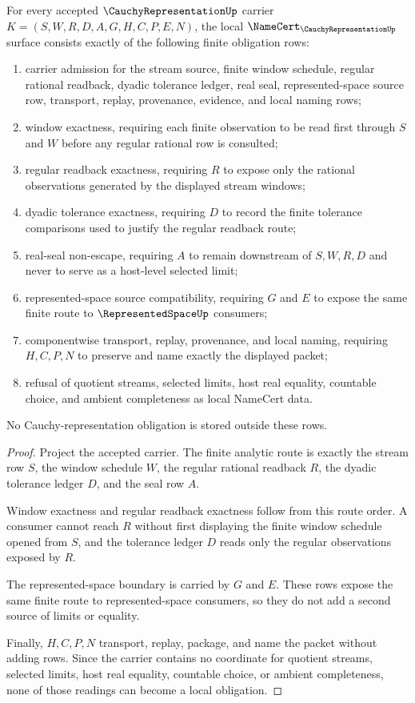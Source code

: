 \begin{theorem}
\label{thm:cauchy-representation-namecert-obligations}
For every accepted $\CauchyRepresentationUp$ carrier $K=(S,W,R,D,A,G,H,C,P,E,N)$, the local $\NameCert_{\CauchyRepresentationUp}$ surface consists exactly of the following finite obligation rows:
\begin{enumerate}
\item carrier admission for the stream source, finite window schedule, regular rational readback, dyadic tolerance ledger, real seal, represented-space source row, transport, replay, provenance, evidence, and local naming rows;
\item window exactness, requiring each finite observation to be read first through $S$ and $W$ before any regular rational row is consulted;
\item regular readback exactness, requiring $R$ to expose only the rational observations generated by the displayed stream windows;
\item dyadic tolerance exactness, requiring $D$ to record the finite tolerance comparisons used to justify the regular readback route;
\item real-seal non-escape, requiring $A$ to remain downstream of $S,W,R,D$ and never to serve as a host-level selected limit;
\item represented-space source compatibility, requiring $G$ and $E$ to expose the same finite route to $\RepresentedSpaceUp$ consumers;
\item componentwise transport, replay, provenance, and local naming, requiring $H,C,P,N$ to preserve and name exactly the displayed packet;
\item refusal of quotient streams, selected limits, host real equality, countable choice, and ambient completeness as local NameCert data.
\end{enumerate}
No Cauchy-representation obligation is stored outside these rows.
\end{theorem}
\begin{proof}
Project the accepted carrier. The finite analytic route is exactly the stream row $S$, the window schedule $W$, the regular rational readback $R$, the dyadic tolerance ledger $D$, and the seal row $A$.

Window exactness and regular readback exactness follow from this route order. A consumer cannot reach $R$ without first displaying the finite window schedule opened from $S$, and the tolerance ledger $D$ reads only the regular observations exposed by $R$.

The represented-space boundary is carried by $G$ and $E$. These rows expose the same finite route to represented-space consumers, so they do not add a second source of limits or equality.

Finally, $H,C,P,N$ transport, replay, package, and name the packet without adding rows. Since the carrier contains no coordinate for quotient streams, selected limits, host real equality, countable choice, or ambient completeness, none of those readings can become a local obligation.
\end{proof}

